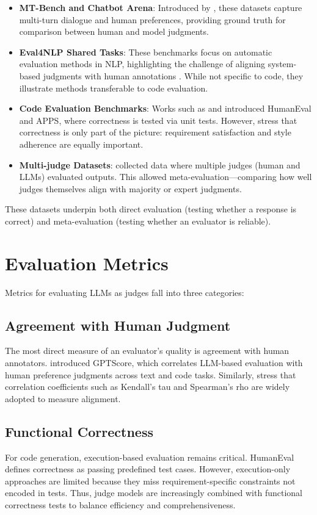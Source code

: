 \begin{itemize}
    \item \textbf{MT-Bench and Chatbot Arena}: Introduced by \citet{zheng2023judgelm}, these datasets capture multi-turn dialogue and human preferences, providing ground truth for comparison between human and model judgments.
    \item \textbf{Eval4NLP Shared Tasks}: These benchmarks focus on automatic evaluation methods in NLP, highlighting the challenge of aligning system-based judgments with human annotations \citep{zeng2023llm}. While not specific to code, they illustrate methods transferable to code evaluation.
    \item \textbf{Code Evaluation Benchmarks}: Works such as \citet{chen2021evaluating} and \citet{hendrycks2021measuring} introduced HumanEval and APPS, where correctness is tested via unit tests. However, \citet{fu2023gptscore} stress that correctness is only part of the picture: requirement satisfaction and style adherence are equally important.
    \item \textbf{Multi-judge Datasets}: \citet{wang2023aligning} collected data where multiple judges (human and LLMs) evaluated outputs. This allowed meta-evaluation—comparing how well judges themselves align with majority or expert judgments.
\end{itemize}

These datasets underpin both direct evaluation (testing whether a response is correct) and meta-evaluation (testing whether an evaluator is reliable).

\section{Evaluation Metrics}
Metrics for evaluating LLMs as judges fall into three categories:

\subsection{Agreement with Human Judgment}
The most direct measure of an evaluator’s quality is agreement with human annotators. \citet{fu2023gptscore} introduced GPTScore, which correlates LLM-based evaluation with human preference judgments across text and code tasks. Similarly, \citet{xu2023survey} stress that correlation coefficients such as Kendall’s tau and Spearman’s rho are widely adopted to measure alignment.

\subsection{Functional Correctness}
For code generation, execution-based evaluation remains critical. HumanEval \citep{chen2021evaluating} defines correctness as passing predefined test cases. However, execution-only approaches are limited because they miss requirement-specific constraints not encoded in tests. Thus, judge models are increasingly combined with functional correctness tests to balance efficiency and comprehensiveness.

